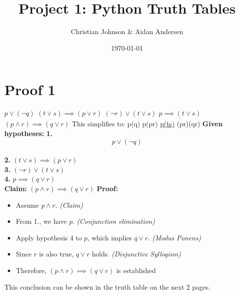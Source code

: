 \documentclass[11pt]{article}
\author{Christian Johnson \& Aidan Andersen}
\date{\today}
\title{Project 1: Python Truth Tables}
\begin{document}
\maketitle
\newpage
\section*{Proof 1}
\label{sec:org56a9383}
$p\lor(\lnot q)$\newline
$(t\lor s)\implies(p\lor r)$\newline
$(\lnot r)\lor(t\lor s)$\newline
$\underline{p\implies(t\lor s)}$\newline
$(p\land r)\implies(q\lor r)$\newline\newline
This simplifies to:
\newline
p\lor(\lnot q)\newline
p\implies(p\lor r)\newline
\underline{p\implies(t\lor s)}\newline
(p\land r)\implies (q\lor r)
\newline\newline
\textbf{Given hypotheses:}
\newline
\indent\textbf{1. } $$p\lor (\lnot q)$$ \\
\indent\textbf{2. } $(t\lor s) \implies (p\lor r)$\\
\indent\textbf{3.} $(\lnot r) \lor (t\lor s)$\\
\indent\textbf{4.} $p \implies (q\lor r)$\\
\newline
\textbf{Claim:} $(p \land r) \implies (q\lor r)$\newline
\newline
\textbf{Proof:}
\begin{itemize}
\item Assume $p \land r$. \textit{(Claim)}
\item From 1., we have $p$. \textit{(Conjunction elimination)}
\item Apply hypothesis 4 to $p$, which implies $q\lor r$. \textit{(Modus Ponens)}
\item Since $r$ is also true, $q\lor r$ holds. \textit{(Disjunctive Syllogism)}
\item Therefore, $(p\land r)\implies (q\lor r)$ is established
\end{itemize}
\newline\newline
This conclusion can be shown in the truth table on the next 2 pages.
\end{document}
